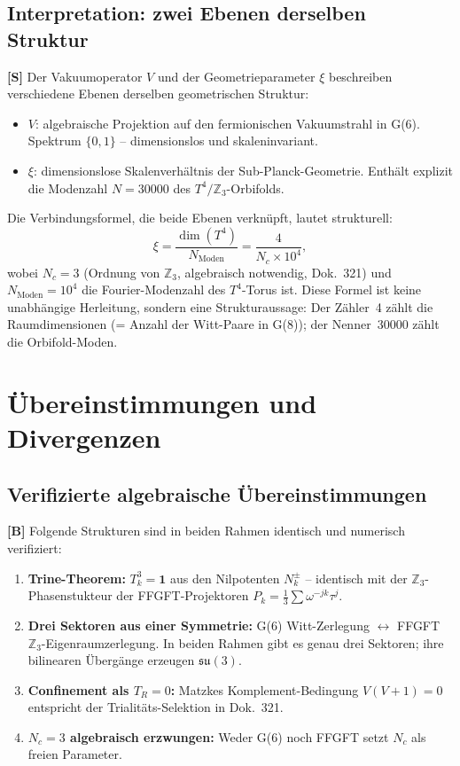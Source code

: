 \subsection{Interpretation: zwei Ebenen derselben Struktur}

\textbf{[S]} Der Vakuumoperator $V$ und der Geometrieparameter $\xi$
beschreiben verschiedene Ebenen derselben geometrischen Struktur:

\begin{itemize}
  \item $V$: algebraische Projektion auf den fermionischen Vakuumstrahl
    in G(6). Spektrum $\{0,1\}$ -- dimensionslos und skaleninvariant.
  \item $\xi$: dimensionslose Skalenverhältnis der Sub-Planck-Geometrie.
    Enthält explizit die Modenzahl $N = 30000$ des $T^4/\mathbb{Z}_3$-Orbifolds.
\end{itemize}

Die Verbindungsformel, die beide Ebenen verknüpft, lautet strukturell:
\begin{equation}
  \xi = \frac{\dim(T^4)}{N_{\text{Moden}}} = \frac{4}{N_c \times 10^4},
  \label{eq:xi_struct}
\end{equation}
wobei $N_c = 3$ (Ordnung von $\mathbb{Z}_3$, algebraisch notwendig, Dok.~321)
und $N_{\text{Moden}} = 10^4$ die Fourier-Modenzahl des $T^4$-Torus ist.
Diese Formel ist keine unabhängige Herleitung, sondern eine Strukturaussage:
Der Zähler~4 zählt die Raumdimensionen (= Anzahl der Witt-Paare in G(8));
der Nenner~30000 zählt die Orbifold-Moden.

\section{Übereinstimmungen und Divergenzen}

\subsection{Verifizierte algebraische Übereinstimmungen}

\textbf{[B]} Folgende Strukturen sind in beiden Rahmen identisch und
numerisch verifiziert:

\begin{enumerate}
  \item \textbf{Trine-Theorem:} $T_k^3 = \mathbf{1}$ aus den Nilpotenten
    $N_k^\pm$ -- identisch mit der $\mathbb{Z}_3$-Phasenstukteur der
    FFGFT-Projektoren $P_k = \frac{1}{3}\sum\omega^{-jk}\tau^j$.
  \item \textbf{Drei Sektoren aus einer Symmetrie:}
    G(6) Witt-Zerlegung $\leftrightarrow$ FFGFT $\mathbb{Z}_3$-Eigenraumzerlegung.
    In beiden Rahmen gibt es genau drei Sektoren; ihre bilinearen Übergänge
    erzeugen $\mathfrak{su}(3)$.
  \item \textbf{Confinement als $T_R = 0$:} Matzkes Komplement-Bedingung
    $V(V+1) = 0$ entspricht der Trialitäts-Selektion in Dok.~321.
  \item \textbf{$N_c = 3$ algebraisch erzwungen:}
    Weder G(6) noch FFGFT setzt $N_c$ als freien Parameter.
\end{enumerate}

